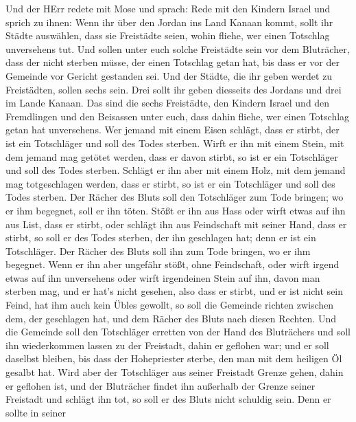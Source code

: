  Und der HErr redete mit Mose und sprach:  Rede
mit den Kindern Israel und sprich zu ihnen: Wenn ihr über den Jordan ins
Land Kanaan kommt,  sollt ihr Städte auswählen, dass sie
Freistädte seien, wohin fliehe, wer einen Totschlag unversehens tut.
 Und sollen unter euch solche Freistädte sein vor dem
Bluträcher, dass der nicht sterben müsse, der einen Totschlag getan hat,
bis dass er vor der Gemeinde vor Gericht gestanden sei. 
Und der Städte, die ihr geben werdet zu Freistädten, sollen sechs sein.
 Drei sollt ihr geben diesseits des Jordans und drei im
Lande Kanaan.  Das sind die sechs Freistädte, den Kindern
Israel und den Fremdlingen und den Beisassen unter euch, dass dahin
fliehe, wer einen Totschlag getan hat unversehens.  Wer
jemand mit einem Eisen schlägt, dass er stirbt, der ist ein Totschläger
und soll des Todes sterben.  Wirft er ihn mit einem Stein,
mit dem jemand mag getötet werden, dass er davon stirbt, so ist er ein
Totschläger und soll des Todes sterben.  Schlägt er ihn
aber mit einem Holz, mit dem jemand mag totgeschlagen werden, dass er
stirbt, so ist er ein Totschläger und soll des Todes sterben.
 Der Rächer des Bluts soll den Totschläger zum Tode
bringen; wo er ihm begegnet, soll er ihn töten.  Stößt er
ihn aus Hass oder wirft etwas auf ihn aus List, dass er stirbt,
 oder schlägt ihn aus Feindschaft mit seiner Hand, dass er
stirbt, so soll er des Todes sterben, der ihn geschlagen hat; denn er
ist ein Totschläger. Der Rächer des Bluts soll ihn zum Tode bringen, wo
er ihm begegnet.  Wenn er ihn aber ungefähr stößt, ohne
Feindschaft, oder wirft irgend etwas auf ihn unversehens 
oder wirft irgendeinen Stein auf ihn, davon man sterben mag, und er
hat's nicht gesehen, also dass er stirbt, und er ist nicht sein Feind,
hat ihm auch kein Übles gewollt,  so soll die Gemeinde
richten zwischen dem, der geschlagen hat, und dem Rächer des Bluts nach
diesen Rechten.  Und die Gemeinde soll den Totschläger
erretten von der Hand des Bluträchers und soll ihn wiederkommen lassen
zu der Freistadt, dahin er geflohen war; und er soll daselbst bleiben,
bis dass der Hohepriester sterbe, den man mit dem heiligen Öl gesalbt
hat.  Wird aber der Totschläger aus seiner Freistadt Grenze
gehen, dahin er geflohen ist,  und der Bluträcher findet
ihn außerhalb der Grenze seiner Freistadt und schlägt ihn tot, so soll
er des Bluts nicht schuldig sein.  Denn er sollte in seiner
